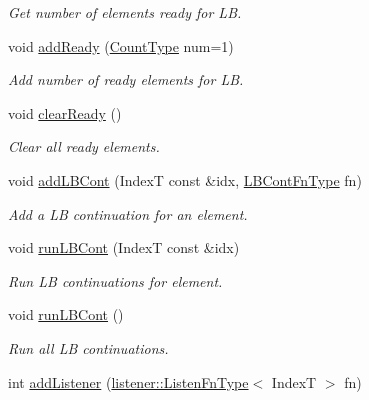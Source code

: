 \begin{DoxyCompactItemize}
\begin{DoxyCompactList}\small\item\em Get number of elements ready for LB. \end{DoxyCompactList}\item 
void \hyperlink{structvt_1_1vrt_1_1collection_1_1_holder_ac41862395e0a1f6d0e68ebcd17c44824}{add\+Ready} (\hyperlink{structvt_1_1vrt_1_1collection_1_1_holder_a3251a556ac19fc7dc4d0bd388cfaedeb}{Count\+Type} num=1)
\begin{DoxyCompactList}\small\item\em Add number of ready elements for LB. \end{DoxyCompactList}\item 
void \hyperlink{structvt_1_1vrt_1_1collection_1_1_holder_a2a16bdae9bb011c1f32cd1cbf4a93f55}{clear\+Ready} ()
\begin{DoxyCompactList}\small\item\em Clear all ready elements. \end{DoxyCompactList}\item 
void \hyperlink{structvt_1_1vrt_1_1collection_1_1_holder_a9f0e6df0202f45cdfb8b190fbce86141}{add\+L\+B\+Cont} (IndexT const \&idx, \hyperlink{structvt_1_1vrt_1_1collection_1_1_holder_a01812f8ee06d3a67e1a9aa2765989913}{L\+B\+Cont\+Fn\+Type} fn)
\begin{DoxyCompactList}\small\item\em Add a LB continuation for an element. \end{DoxyCompactList}\item 
void \hyperlink{structvt_1_1vrt_1_1collection_1_1_holder_a0e7fd8983ff18f85b7a2360b3732ef0a}{run\+L\+B\+Cont} (IndexT const \&idx)
\begin{DoxyCompactList}\small\item\em Run LB continuations for element. \end{DoxyCompactList}\item 
void \hyperlink{structvt_1_1vrt_1_1collection_1_1_holder_a4cb7b41d1bbdf4531e89ad56e24def97}{run\+L\+B\+Cont} ()
\begin{DoxyCompactList}\small\item\em Run all LB continuations. \end{DoxyCompactList}\item 
int \hyperlink{structvt_1_1vrt_1_1collection_1_1_holder_a07ea68abde3582b2300a86b32c3ff3e8}{add\+Listener} (\hyperlink{namespacevt_1_1vrt_1_1collection_1_1listener_a62d04c44a3c187eae66bdba2090b4505}{listener\+::\+Listen\+Fn\+Type}$<$ IndexT $>$ fn)

\end{DoxyCompactItemize}
